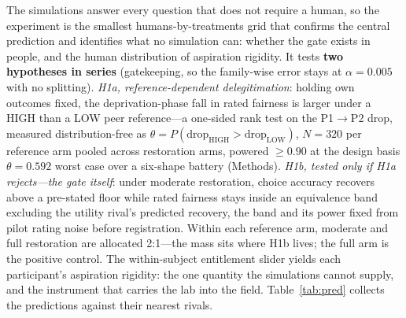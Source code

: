 \documentclass[11pt]{article}
\newcommand{\1}{\mathbf{1}}
\begin{document}
The simulations answer every question that does not require a human, so the experiment is the smallest humans-by-treatments grid that confirms the central prediction and identifies what no simulation can: whether the gate exists in people, and the human distribution of aspiration rigidity. It tests \textbf{two hypotheses in series} (gatekeeping, so the family-wise error stays at $\alpha=0.005$ with no splitting). \emph{H1a, reference-dependent delegitimation}: holding own outcomes fixed, the deprivation-phase fall in rated fairness is larger under a HIGH than a LOW peer reference---a one-sided rank test on the P1$\to$P2 drop, measured distribution-free as $\theta=P(\mathrm{drop}_{\mathrm{HIGH}}>\mathrm{drop}_{\mathrm{LOW}})$, $N=320$ per reference arm pooled across restoration arms, powered $\ge0.90$ at the design basis $\theta=0.592$ worst case over a six-shape battery (Methods). \emph{H1b, tested only if H1a rejects---the gate itself}: under moderate restoration, choice accuracy recovers above a pre-stated floor while rated fairness stays inside an equivalence band excluding the utility rival's predicted recovery, the band and its power fixed from pilot rating noise before registration. Within each reference arm, moderate and full restoration are allocated 2:1---the mass sits where H1b lives; the full arm is the positive control. The within-subject entitlement slider yields each participant's aspiration rigidity: the one quantity the simulations cannot supply, and the instrument that carries the lab into the field. Table~\ref{tab:pred} collects the predictions against their nearest rivals.
\end{document}
